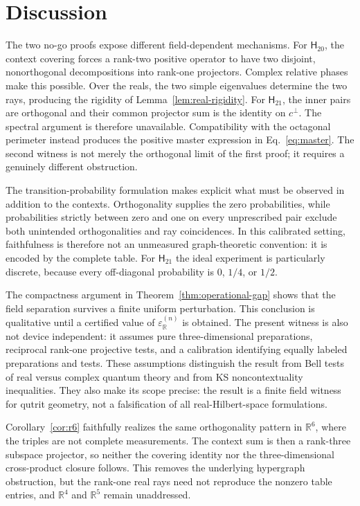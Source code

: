\documentclass[twocolumn,aps,pra,floatfix,amsmath,amssymb,longbibliography]{revtex4-2}
\theoremstyle{definition}
\theoremstyle{remark}
\newcommand{\R}{\mathbb R}
\newcommand{\Htwenty}{\mathsf H_{20}}
\newcommand{\Htwentyone}{\mathsf H_{21}}
\begin{document}
\section{Discussion}

The two no-go proofs expose different field-dependent mechanisms.  For
$\Htwenty$, the context covering forces a rank-two positive operator to have
two disjoint, nonorthogonal decompositions into rank-one projectors.  Complex
relative phases make this possible.  Over the reals, the two simple
eigenvalues determine the two rays, producing the rigidity of
Lemma~\ref{lem:real-rigidity}.  For $\Htwentyone$, the inner pairs are
orthogonal and their common projector sum is the identity on $c^\perp$.
The spectral argument is therefore unavailable.  Compatibility with the
octagonal perimeter instead produces the positive master expression in
Eq.~\eqref{eq:master}.  The second witness is not merely the orthogonal limit
of the first proof; it requires a genuinely different obstruction.

The transition-probability formulation makes explicit what must be observed
in addition to the contexts.  Orthogonality supplies the zero probabilities,
while probabilities strictly between zero and one on every unprescribed pair
exclude both unintended orthogonalities and ray coincidences.  In this
calibrated setting,
faithfulness is therefore not an unmeasured graph-theoretic convention: it is
encoded by the complete table.  For $\Htwentyone$ the ideal experiment is
particularly discrete, because every off-diagonal probability is $0$, $1/4$,
or $1/2$.

The compactness argument in Theorem~\ref{thm:operational-gap} shows that the
field separation survives a finite uniform perturbation.  This conclusion is
qualitative until a certified value of $\varepsilon_{\R}^{(n)}$ is obtained.
The present witness is also not device independent: it assumes pure
three-dimensional preparations, reciprocal rank-one projective tests, and a
calibration identifying equally labeled preparations and tests.  These
assumptions distinguish the result from Bell tests of real versus complex
quantum theory and from KS noncontextuality inequalities.  They also make its
scope precise: the result is a finite field witness for qutrit geometry, not a
falsification of all real-Hilbert-space formulations.

Corollary~\ref{cor:r6} faithfully realizes the same orthogonality pattern in
$\R^6$, where the triples are not complete measurements.  The context sum is
then a rank-three subspace projector, so neither the covering identity nor the
three-dimensional cross-product closure follows.  This removes the underlying
hypergraph obstruction, but the rank-one real rays need not reproduce the
nonzero table entries, and $\R^4$ and $\R^5$ remain unaddressed.
\end{document}
